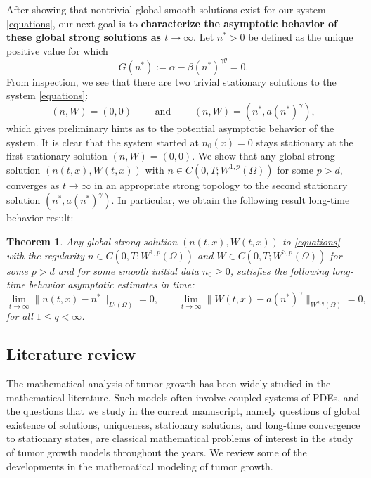 \documentclass[12pt]{article}
\theoremstyle{plain}
\newtheorem{theorem}{Theorem}[section]
\begin{document}
After showing that nontrivial global smooth solutions exist for our system \eqref{equations}, our next goal is to \textbf{characterize the asymptotic behavior of these global strong solutions as $t \to \infty$}. Let $n^{*} > 0$ be defined as the unique positive value for which
\begin{equation}\label{nstardef}
G(n^*) := \alpha - \beta (n^*)^{\gamma \theta} = 0.
\end{equation}
From inspection, we see that there are two trivial stationary solutions to the system \eqref{equations}:
\begin{equation*}
(n, W) = (0, 0) \qquad \text{ and } \qquad (n, W) = (n^{*}, a(n^{*})^{\gamma}),
\end{equation*}
which gives preliminary hints as to the potential asymptotic behavior of the system. It is clear that the system started at $n_{0}(x) = 0$ stays stationary at the first stationary solution $(n, W) = (0, 0)$. We show that any global strong solution $(n(t, x), W(t, x))$ with $n \in C(0, T; W^{1, p}(\Omega))$ for some $p > d$, converges as $t \to \infty$ in an appropriate strong topology to the second stationary solution $(n^{*}, a(n^{*})^{\gamma})$. In particular, we obtain the following result long-time behavior result:

\begin{theorem}\label{longtime}
Any global strong solution $(n(t, x), W(t, x))$ to \eqref{equations} with the regularity $n \in C(0, T; W^{1, p}(\Omega))$ and $W \in C(0, T; W^{3, p}(\Omega))$ for some $p > d$ and for some smooth initial data $n_{0} \ge 0$, satisfies the following long-time behavior asymptotic estimates in time:
\begin{equation*}
\lim_{t \to \infty} \|n(t, x) - n^{*}\|_{L^{q}(\Omega)} = 0, \qquad \lim_{t \to \infty} \|W(t, x) - a(n^{*})^{\gamma}\|_{W^{2, q}(\Omega)} = 0,
\end{equation*}
for all $1 \le q < \infty$. 
\end{theorem}

\subsection{Literature review}

The mathematical analysis of tumor growth has been widely studied in the mathematical literature. Such models often involve coupled systems of PDEs, and the questions that we study in the current manuscript, namely questions of global existence of solutions, uniqueness, stationary solutions, and long-time convergence to stationary states, are classical mathematical problems of interest in the study of tumor growth models throughout the years. We review some of the developments in the mathematical modeling of tumor growth.
\end{document}
